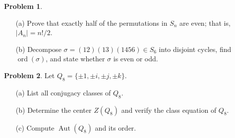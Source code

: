 \documentclass[12pt]{article}
\theoremstyle{definition} %
\newtheorem{problem}{Problem}
\theoremstyle{plain} %
\begin{document}
\bigskip
\begin{problem}
  \begin{enumerate}
      \item[(a)] Prove that exactly half of the permutations in \(S_{n}\)
                are even; that is, \(|A_{n}|=n!/2\).
      \item[(b)] Decompose
                \(\sigma=(12)(13)(1456)\in S_{6}\)
                into disjoint cycles, find \(\operatorname{ord}(\sigma)\),
                and state whether \(\sigma\) is even or odd.
  \end{enumerate}
\end{problem}

\bigskip
\begin{problem}
  Let \(Q_{8}=\{\pm1,\pm i,\pm j,\pm k\}\).
  \begin{enumerate}
      \item[(a)] List all conjugacy classes of \(Q_{8}\).
      \item[(b)] Determine the center \(Z(Q_{8})\) and verify the
                class equation of \(Q_{8}\).
      \item[(c)] Compute \(\operatorname{Aut}(Q_{8})\) and its order.
  \end{enumerate}
\end{problem}
\end{document}
